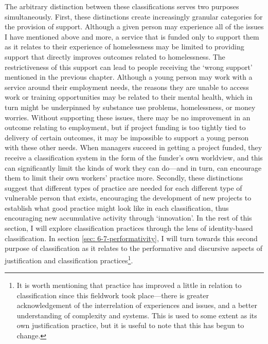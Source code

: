 The arbitrary distinction between these classifications serves two purposes simultaneously. First, these distinctions create increasingly granular categories for the provision of support. Although a given person may experience all of the issues I have mentioned above and more, a service that is funded only to support them as it relates to their experience of homelessness may be limited to providing support that directly improves outcomes related to homelessness. The restrictiveness of this support can lead to people receiving the `wrong support' mentioned in the previous chapter. Although a young person may work with a service around their employment needs, the reasons they are unable to access work or training opportunities may be related to their mental health, which in turn might be underpinned by substance use problems, homelessness, or money worries. Without supporting these issues, there may be no improvement in an outcome relating to employment, but if project funding is too tightly tied to delivery of certain outcomes, it may be impossible to support a young person with these other needs. When managers succeed in getting a project funded, they receive a classification system in the form of the funder's own worldview, and this can significantly limit the kinds of work they can do—and in turn, can encourage them to limit their own workers' practice more.  Secondly, these distinctions suggest that different types of practice are needed for each different type of vulnerable person that exists, encouraging the development of new projects to establish what good practice might look like in each classification, thus encouraging new accumulative activity through `innovation'. In the rest of this section, I will explore classification practices through the lens of identity-based classification. In section \ref{sec: 6-7-performativity}, I will turn towards this second purpose of classification as it relates to the performative and discursive aspects of justification and classification practices\footnote{It is worth mentioning that practice has improved a little in relation to classification since this fieldwork took place—there is greater acknowledgement of the interrelation of experiences and issues, and a better understanding of complexity and systems. This is used to some extent as its own justification practice, but it is useful to note that this has begun to change.}.

